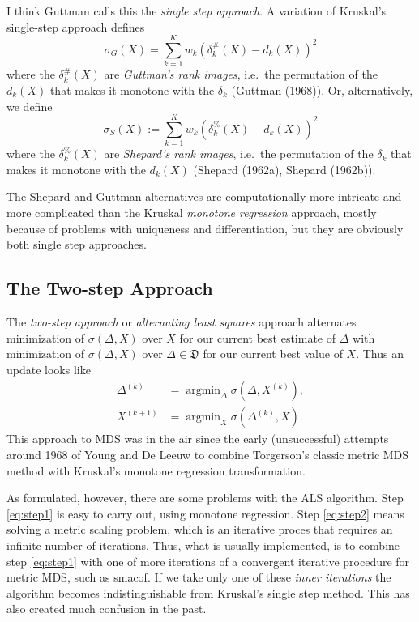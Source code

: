 \documentclass[
  12pt,
]{article}
\begin{document}
I think Guttman calls this the \emph{single step approach}. A variation of Kruskal's single-step approach defines
\[
\sigma_G(X)=\sum_{k=1}^Kw_k(\delta_k^\#(X)-d_k(X))^2
\]
where the \(\delta_k^\#(X)\) are \emph{Guttman's rank images}, i.e.~the permutation of the
\(d_k(X)\) that makes it monotone with the \(\delta_k\) (Guttman (1968)). Or, alternatively, we define
\[
\sigma_S(X):=\sum_{k=1}^Kw_k(\delta_k^\%(X)-d_k(X))^2
\]
where the \(\delta_k^\%(X)\) are \emph{Shepard's rank images}, i.e.~the permutation of
the \(\delta_k\) that makes it monotone with the \(d_k(X)\) (Shepard (1962a), Shepard (1962b)).

The Shepard and Guttman alternatives are computationally more intricate and more complicated
than the Kruskal \emph{monotone regression} approach, mostly because of problems with uniqueness and differentiation, but they are obviously both single step approaches.

\subsection{The Two-step Approach}\label{the-two-step-approach}

The \emph{two-step approach} or \emph{alternating least squares} approach alternates minimization
of \(\sigma(\Delta,X)\) over \(X\) for our current best estimate of \(\Delta\) with
minimization of \(\sigma(\Delta,X)\) over \(\Delta\in\mathfrak{D}\) for our current best
value of \(X\). Thus an update looks like
\begin{align}
\Delta^{(k)}&=\mathop{\text{argmin}}_\Delta\sigma(\Delta,X^{(k)})\label{eq:step1},\\
X^{(k+1)}&=\mathop{\text{argmin}}_X\sigma(\Delta^{(k)},X)\label{eq:step2}.
\end{align}
This approach to MDS was in the air since the early (unsuccessful) attempts around 1968 of Young and De Leeuw to combine Torgerson's classic metric MDS method with Kruskal's monotone regression transformation.

As formulated, however, there are some problems with the ALS algorithm.
Step \eqref{eq:step1} is easy to carry out, using monotone regression. Step \eqref{eq:step2} means solving a metric scaling problem,
which is an iterative proces that requires an infinite number of iterations. Thus, what is usually
implemented, is to combine step \eqref{eq:step1} with one of more iterations of a convergent iterative procedure
for metric MDS, such as smacof. If we take only one of these \emph{inner iterations} the algorithm
becomes indistinguishable from Kruskal's single step method. This has also created much confusion in the
past.
\end{document}
